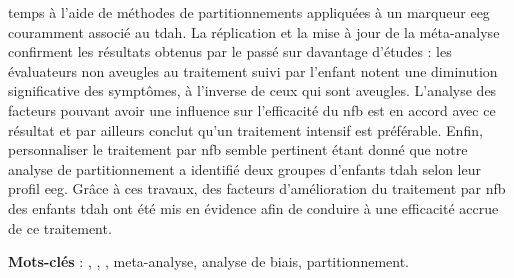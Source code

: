temps à l'aide de méthodes de partitionnements appliquées à un marqueur \gls{eeg} couramment associé au \gls{tdah}. 
La réplication et la mise à jour de la méta-analyse confirment les résultats obtenus par le passé sur davantage d'études : les évaluateurs non aveugles au traitement suivi par 
l'enfant notent une diminution significative des symptômes, à l'inverse de ceux qui sont aveugles. L'analyse des facteurs pouvant avoir une influence sur l'efficacité du \gls{nfb}
est en accord avec ce résultat et par ailleurs conclut qu'un traitement intensif est préférable. Enfin, personnaliser le traitement par \gls{nfb} semble pertinent étant donné que notre 
analyse de partitionnement a identifié deux groupes d'enfants \gls{tdah} selon leur profil \gls{eeg}.
Grâce à ces travaux, des facteurs d'amélioration du traitement par \gls{nfb} des enfants \gls{tdah} ont été mis en évidence afin de conduire à une efficacité accrue de ce traitement.




\large{\textbf{Mots-clés}} : , , , meta-analyse, analyse de biais, partitionnement.